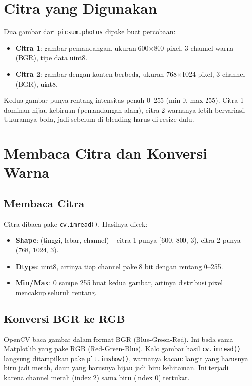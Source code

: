 \documentclass[11pt,a4paper]{article}
\begin{document}
\section{Citra yang Digunakan}

Dua gambar dari \texttt{picsum.photos} dipake buat percobaan:

\begin{itemize}
    \item \textbf{Citra 1}: gambar pemandangan, ukuran 600$\times$800 pixel, 3 channel warna (BGR), tipe data uint8.
    \item \textbf{Citra 2}: gambar dengan konten berbeda, ukuran 768$\times$1024 pixel, 3 channel (BGR), uint8.
\end{itemize}

Kedua gambar punya rentang intensitas penuh 0--255 (min 0, max 255). Citra 1 dominan hijau kebiruan (pemandangan alam), citra 2 warnanya lebih bervariasi. Ukurannya beda, jadi sebelum di-blending harus di-resize dulu.

\section{Membaca Citra dan Konversi Warna}

\subsection{Membaca Citra}

Citra dibaca pake \texttt{cv.imread()}. Hasilnya dicek:
\begin{itemize}
    \item \textbf{Shape}: (tinggi, lebar, channel) -- citra 1 punya (600, 800, 3), citra 2 punya (768, 1024, 3).
    \item \textbf{Dtype}: uint8, artinya tiap channel pake 8 bit dengan rentang 0--255.
    \item \textbf{Min/Max}: 0 sampe 255 buat kedua gambar, artinya distribusi pixel mencakup seluruh rentang.
\end{itemize}

\subsection{Konversi BGR ke RGB}

OpenCV baca gambar dalam format BGR (Blue-Green-Red). Ini beda sama Matplotlib yang pake RGB (Red-Green-Blue). Kalo gambar hasil \texttt{cv.imread()} langsung ditampilkan pake \texttt{plt.imshow()}, warnanya kacau: langit yang harusnya biru jadi merah, daun yang harusnya hijau jadi biru kehitaman. Ini terjadi karena channel merah (index 2) sama biru (index 0) tertukar.
\end{document}

